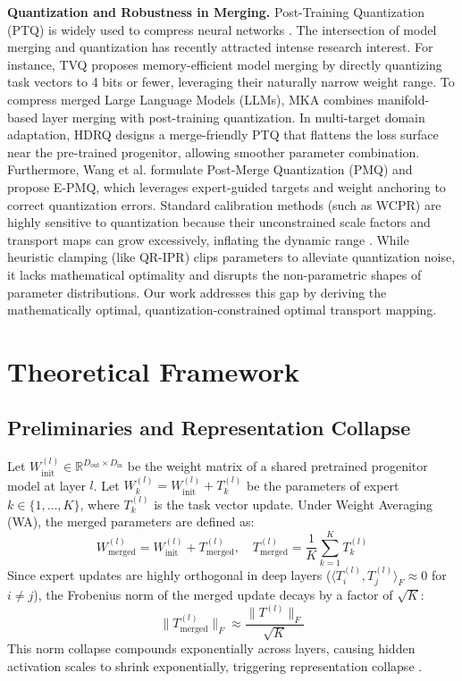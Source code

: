 \documentclass{article}
\theoremstyle{plain}
\theoremstyle{definition}
\theoremstyle{remark}
\begin{document}
\textbf{Quantization and Robustness in Merging.} Post-Training Quantization (PTQ) is widely used to compress neural networks \cite{Dettmers2022LLM8bit, Frantar2023GPTQ}. The intersection of model merging and quantization has recently attracted intense research interest. For instance, TVQ \cite{Kim2025TaskVector} proposes memory-efficient model merging by directly quantizing task vectors to 4 bits or fewer, leveraging their naturally narrow weight range. To compress merged Large Language Models (LLMs), MKA \cite{liu-etal-2024-pruning} combines manifold-based layer merging with post-training quantization. In multi-target domain adaptation, HDRQ \cite{Shin2025MergeFriendly} designs a merge-friendly PTQ that flattens the loss surface near the pre-trained progenitor, allowing smoother parameter combination. Furthermore, Wang et al. \cite{Wang2026EPMQ} formulate Post-Merge Quantization (PMQ) and propose E-PMQ, which leverages expert-guided targets and weight anchoring to correct quantization errors. Standard calibration methods (such as WCPR) are highly sensitive to quantization because their unconstrained scale factors and transport maps can grow excessively, inflating the dynamic range \cite{Leclaire2024IPR}. While heuristic clamping (like QR-IPR) clips parameters to alleviate quantization noise, it lacks mathematical optimality and disrupts the non-parametric shapes of parameter distributions. Our work addresses this gap by deriving the mathematically optimal, quantization-constrained optimal transport mapping.

\section{Theoretical Framework}
\label{sec:theory}

\subsection{Preliminaries and Representation Collapse}
Let $W_{\text{init}}^{(l)} \in \mathbb{R}^{D_{\text{out}} \times D_{\text{in}}}$ be the weight matrix of a shared pretrained progenitor model at layer $l$. Let $W_{k}^{(l)} = W_{\text{init}}^{(l)} + T_{k}^{(l)}$ be the parameters of expert $k \in \{1, \dots, K\}$, where $T_{k}^{(l)}$ is the task vector update. Under Weight Averaging (WA), the merged parameters are defined as:
\begin{equation}
    W_{\text{merged}}^{(l)} = W_{\text{init}}^{(l)} + T_{\text{merged}}^{(l)}, \quad T_{\text{merged}}^{(l)} = \frac{1}{K} \sum_{k=1}^K T_{k}^{(l)}
\end{equation}
Since expert updates are highly orthogonal in deep layers ($\langle T_i^{(l)}, T_j^{(l)} \rangle_F \approx 0$ for $i \neq j$), the Frobenius norm of the merged update decays by a factor of $\sqrt{K}$:
\begin{equation}
    \|T_{\text{merged}}^{(l)}\|_F \approx \frac{\|T^{(l)}\|_F}{\sqrt{K}}
\end{equation}
This norm collapse compounds exponentially across layers, causing hidden activation scales to shrink exponentially, triggering representation collapse \cite{Jordan2023Repair}.
\end{document}
